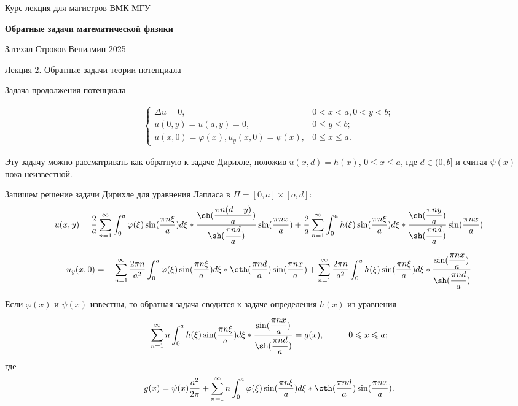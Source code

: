 \documentclass{article}
\begin{document}
\centerline{\large Курс лекция для магистров ВМК МГУ}
\centerline {\textbf{\LARGE Обратные задачи математической физики}}
\centerline {Затехал Строков Вениамин 2025}

\vspace{0.4cm}

\centerline{\LARGE Лекция 2. Обратные задачи теории потенциала}

\vspace{1cm}
\centerline{\large Задача продолжения потенциала}

\begin{align}
\begin{cases}
\Delta u = 0, & 0 < x < a, 0 < y < b;\\
u(0,y) = u(a,y) = 0, & 0 \leqslant y \leqslant b;\\
u(x,0) = \varphi(x), u_y(x,0) = \psi(x), & 0 \leqslant x \leqslant a.
\end{cases}
\end{align}

Эту задачу можно рассматривать как обратную к задаче Дирихле, положив $u(x,d) = h(x)$, $0 \leqslant x \leqslant a$, где $d \in (0,b]$ и считая $\psi(x)$ пока неизвестной. 

Запишем решение задачи Дирихле для уравнения Лапласа в $\Pi = [0,a] \times [o,d]$:
\[
u(x,y) = 
\dfrac{2}{a} \sum_{n=1}^{\infty} \int_0^a \varphi(\xi) \sin(\dfrac{ \pi n \xi }{a}) d \xi *
\dfrac{\sh (\dfrac{\pi n (d-y)}{a})}{\sh( \dfrac{\pi n d}{a})} \sin (\dfrac{\pi n x}{a}) +
\dfrac{2}{a} \sum_{n=1}^{\infty} \int_0^a h(\xi) \sin(\dfrac{ \pi n \xi }{a}) d \xi *
\dfrac{\sh (\dfrac{\pi n y}{a})}{\sh (\dfrac{\pi n d}{a})} \sin( \dfrac{\pi n x}{a})
\]

\[
u_y(x,0) = 
- \sum_{n=1}^{\infty} \dfrac{2 \pi n}{a^2} \int_0^a \varphi(\xi) \sin(\dfrac{ \pi n \xi }{a}) d \xi*
\cth( \dfrac{\pi n d}{a} )\sin( \dfrac{\pi n x}{a} )+
\sum_{n=1}^{\infty} \dfrac{2 \pi n}{a^2} \int_0^a h(\xi) \sin(\dfrac{ \pi n \xi }{a}) d \xi *
\dfrac{\sin( \dfrac{\pi n x}{a})}{\sh (\dfrac{\pi n d}{a})} 
\]

Если $\varphi(x)$ и $\psi(x)$ известны, то обратная задача сводится к задаче определения $h(x)$ из уравнения

\[
\sum_{n=1}^{\infty} n \int_0^a h(\xi) \sin(\dfrac{ \pi n \xi }{a}) d \xi *
\dfrac{\sin( \dfrac{\pi n x}{a})}{\sh (\dfrac{\pi n d}{a})} = g(x), \hspace{1cm} 0 \leqslant x \leqslant a;
\]
где 
\[
g(x) = \psi(x) \frac{a^2}{2 \pi} + \sum_{n=1}^{\infty} n \int_0^a  \varphi(\xi) \sin(\dfrac{ \pi n \xi }{a}) d \xi* \cth (\dfrac{\pi n d}{a}) \sin (\dfrac{\pi n x}{a}).
\]
\end{document}

